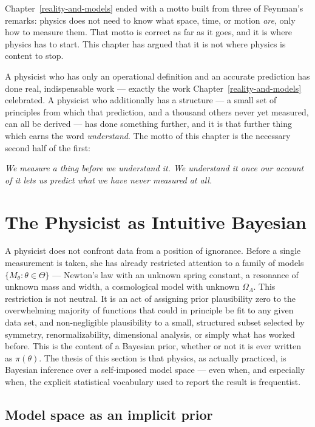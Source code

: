 Chapter~\ref{reality-and-models} ended with a motto built from three of
Feynman's remarks: physics
does not need to know what space, time, or motion \emph{are}, only how to
measure them. That motto is correct as far as it goes, and it is where physics
has to start. This chapter has argued that it is not where physics is content
to stop.

A physicist who has only an operational definition and an accurate prediction
has done real, indispensable work --- exactly the work 
Chapter~\ref{reality-and-models} celebrated. A
physicist who additionally has a structure --- a small set of principles from
which that prediction, and a thousand others never yet measured, can all be
derived --- has done something further, and it is that further thing which
earns the word \emph{understand}. The motto of this chapter is the necessary
second half of the first:

\emph{We measure a thing before we understand it. We understand it once our
account of it lets us predict what we have never measured at all.}

\section{The Physicist as Intuitive Bayesian}
\label{pd:pib}

A physicist does not confront data from a position of ignorance. Before a
single measurement is taken, she has already restricted attention to a family
of models $\{M_\theta : \theta \in \Theta\}$ --- Newton's law with an unknown
spring constant, a resonance of unknown mass and width, a cosmological model
with unknown $\Omega_\Lambda$. This restriction is not neutral. It is an act of
assigning prior plausibility zero to the overwhelming majority of functions
that could in principle be fit to any given data set, and non-negligible
plausibility to a small, structured subset selected by symmetry,
renormalizability, dimensional analysis, or simply what has worked before. This
is the content of a Bayesian prior, whether or not it is ever written as
$\pi(\theta)$. The thesis of this section is that physics, as actually
practiced, is Bayesian inference over a self-imposed model space --- even when,
and especially when, the explicit statistical vocabulary used to report the
result is frequentist.

\subsection{Model space as an implicit prior}

